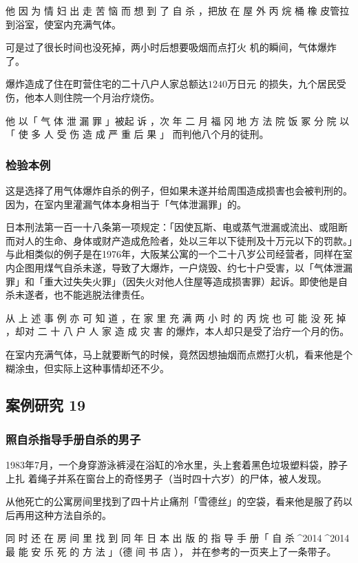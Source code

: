 \documentclass[UTF8]{ctexart}
\begin{document}
他 因 为 情 妇 出 走 苦 恼 而 想 到 了 自 杀 ，把放 在 屋 外 丙 烷 桶 橡 皮管拉到浴室，使室内充满气体。

可是过了很长时间也没死掉，两小时后想要吸烟而点打火 机的瞬间，气体爆炸了。

爆炸造成了住在町营住宅的二十八户人家总额达$1240$万日元 的损失，九个居民受伤，他本人则住院一个月治疗烧伤。 

他 以「 气 体 泄 漏 罪 」被起 诉 ，次 年 二 月 福 冈 地 方 法 院 饭 冢 分 院 以「 使 多 人 受 伤 造 成 严 重 后 果 」 而判他八个月的徒刑。

\subsubsection*{检验本例}

这是选择了用气体爆炸自杀的例子，但如果未遂并给周围造成损害也会被判刑的。
因为，在室内里灌漏气体本身相当于「气体泄漏罪」的。

日本刑法第一百一十八条第一项规定：「因使瓦斯、电或蒸气泄漏或流出、或阻断而对人的生命、身体或财产造成危险者，处以三年以下徒刑及十万元以下的罚款。」与此相类似的例子是在1976年，大阪某公寓的一个二十八岁公司经营者，同样在室内企图用煤气自杀未遂，导致了大爆炸，一户烧毁、约七十户受害，以「气体泄漏罪」和「重大过失失火罪」（因失火对他人住屋等造成损害罪）起诉。即使他是自杀未遂者，也不能逃脱法律责任。

从 上 述 事 例 亦 可 知 道 ，在 家 里 充 满 两 小 时 的 丙 烷 也 可 能 没 死 掉 ，却对 二 十 八 户 人 家 造 成 灾 害 的爆炸，本人却只是受了治疗一个月的伤。

在室内充满气体，马上就要断气的时候，竟然因想抽烟而点燃打火机，看来他是个糊涂虫，但实际上这种事情却还不少。


\subsection{案例研究 19}

\subsubsection*{照自杀指导手册自杀的男子}

1983年7月，一个身穿游泳裤浸在浴缸的冷水里，头上套着黑色垃圾塑料袋，脖子上扎
着绳子并系在窗台上的奇怪男子（当时四十六岁）的尸体，被人发现。

从他死亡的公寓房间里找到了四十片止痛剂「雪德丝」的空袋，看来他是服了药以后再用这种方法自杀的。

同 时 还 在 房 间 里 找 到 同 年 日 本 出 版 的 指 导 手 册「 自 杀^^^^2014^^^^2014最 能 安 乐 死 的 方 法 」（德 间 书 店 ）， 并在参考的一页夹上了一条带子。
\end{document}
